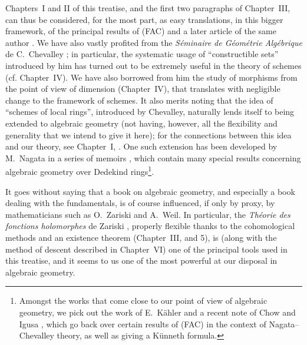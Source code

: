 Chapters~I and II of this treatise, and the first two paragraphs of Chapter~III,
can thus be considered, for the most part, as easy translations, in this bigger
framework, of the principal results of (FAC) and a later article of the same
author \cite{I-15}. We have also vastly profited from the {\it S\'eminaire de
G\'eom\'etrie Alg\'ebrique} de C.~Chevalley \cite{I-1}; in particular, the
systematic usage of ``constructible sets'' introduced by him has turned out to
be extremely useful in the theory of schemes (cf. Chapter~IV). We have also
borrowed from him the study of morphisms from
the point of view of dimension (Chapter~IV), that translates with negligible
change to the framework of schemes. It also merits noting that the idea of
``schemes of local rings'', introduced by Chevalley, naturally lends itself to
being extended to algebraic geometry (not having, however, all the flexibility
and generality that we intend to give it here); for the connections between this
idea and our theory, see Chapter~I, . One such extension has been
developed by M.~Nagata in a series of memoirs \cite{I-9}, which contain many
special results concerning algebraic geometry over Dedekind
rings\footnote{Amongst the works that come close to our point of view of
algebraic geometry, we pick out the work of E.~K\"ahler \cite{I-22} and a recent
note of Chow and Igusa \cite{I-3}, which go back over certain results of (FAC) in
the context of Nagata--Chevalley theory, as well as giving a K\"unneth
formula.}.

\sectionbreak

It goes without saying that a book on algebraic geometry, and especially a book
dealing with the fundamentals, is of course influenced, if only by proxy, by
mathematicians such as O.~Zariski and A.~Weil. In particular, the
{\it Th\'eorie des fonctions holomorphes} de Zariski \cite{I-20}, properly
flexible thanks to the cohomological methods and an existence theorem
(Chapter~III, \textsection{} and 5), is (along with the method of
descent described in Chapter~VI) one of the principal tools used in this
treatise, and it seems to us one of the most powerful at our disposal in
algebraic geometry.

